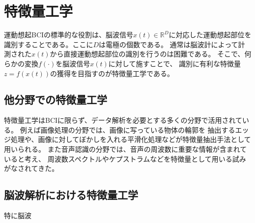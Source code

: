 
\section{特徴量工学}
運動想起BCIの標準的な役割は、脳波信号\(x(t)\in \mathbb R^D\)に対応した運動想起部位を識別することである。ここに\(D\)は電極の個数である。
通常は脳波計によって計測された\(x(t)\)から直接運動想起部位の識別を行うのは困難である。
そこで、何らかの変換\(f(\cdot)\)を脳波信号\(x(t)\)に対して施すことで、
識別に有利な特徴量\(z=f(x(t))\)の獲得を目指すのが特徴量工学である。

\subsection{他分野での特徴量工学}
特徴量工学はBCIに限らず、データ解析を必要とする多くの分野で活用されている。
例えば画像処理の分野では、画像に写っている物体の輪郭を
抽出するエッジ処理や、画像に対してぼかしを入れる平滑化処理などが特徴量抽出手法として用いられる。
また音声認識の分野では、音声の周波数に重要な情報が含まれていると考え、
周波数スペクトルやケプストラムなどを特徴量として用いる試みがなされてきた。

\subsection{脳波解析における特徴量工学}
特に脳波








